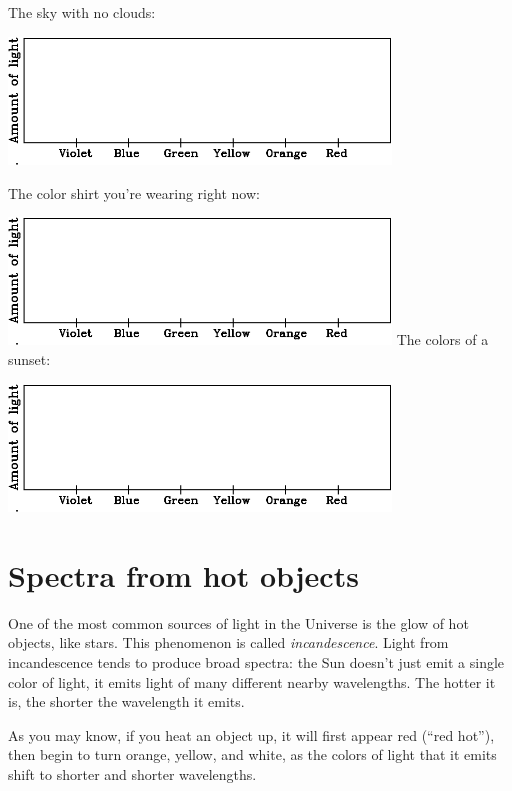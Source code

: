 \documentclass[11pt]{article}
\begin{document}
\begin{center}

\large

The sky with no clouds:

\includegraphics[width=4in]{blank-spectrum-crop.pdf}

\bigskip

The color shirt you're wearing right now:

\includegraphics[width=4in]{blank-spectrum-crop.pdf}
\bigskip
\newpage
The colors of a sunset:

\includegraphics[width=4in]{blank-spectrum-crop.pdf}
\bigskip

\end{center}
\section{Spectra from hot objects}

One of the most common sources of light in the Universe is the glow of hot objects, like stars. This phenomenon is called {\it incandescence}. 
Light from incandescence tends to produce broad spectra: the Sun doesn't just emit a single color of light, it emits light of many different 
nearby wavelengths. The hotter it is, the shorter the wavelength it emits.

As you may know, if you heat an object up, it will first appear red (``red hot''), then begin to turn orange, yellow, and white, as the colors of light 
that it emits shift to shorter and shorter wavelengths.
\end{document}
